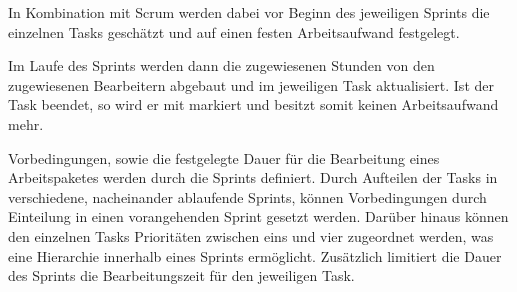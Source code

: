 \noindent
In Kombination mit Scrum werden dabei vor Beginn des jeweiligen Sprints die einzelnen Tasks geschätzt und auf einen festen Arbeitsaufwand festgelegt. 

\noindent
Im Laufe des Sprints werden dann die zugewiesenen Stunden von den zugewiesenen Bearbeitern abgebaut und im jeweiligen Task aktualisiert.
Ist der Task beendet, so wird er mit  markiert und besitzt somit keinen Arbeitsaufwand mehr.

\noindent
Vorbedingungen, sowie die festgelegte Dauer für die Bearbeitung eines Arbeitspaketes werden durch die Sprints definiert. 
Durch Aufteilen der Tasks in verschiedene, nacheinander ablaufende Sprints, können Vorbedingungen durch Einteilung in einen vorangehenden Sprint gesetzt werden.
Darüber hinaus können den einzelnen Tasks Prioritäten zwischen eins und vier zugeordnet werden, was eine Hierarchie innerhalb eines Sprints ermöglicht.
Zusätzlich limitiert die Dauer des Sprints die Bearbeitungszeit für den jeweiligen Task.

\newpage
